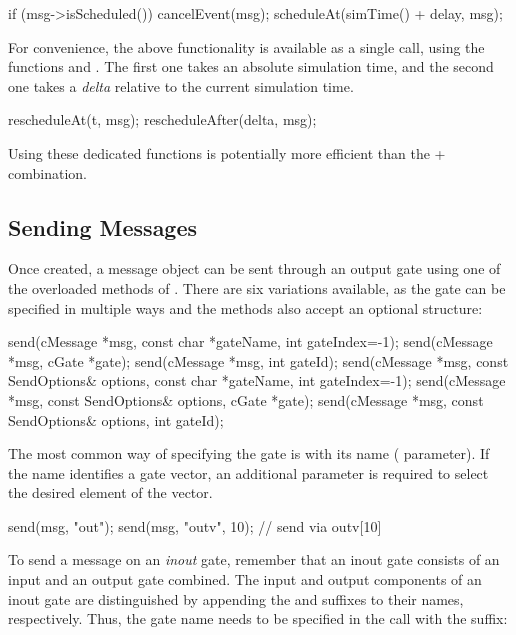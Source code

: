 \begin{cpp}
if (msg->isScheduled())
    cancelEvent(msg);
scheduleAt(simTime() + delay, msg);
\end{cpp}

For convenience, the above functionality is available as a single
call, using the functions  and .
The first one takes an absolute simulation time, and the second one
takes a \textit{delta} relative to the current simulation time.

\begin{cpp}
rescheduleAt(t, msg);
rescheduleAfter(delta, msg);
\end{cpp}

Using these dedicated functions is potentially more efficient than the
 +  combination.

\subsection{Sending Messages}
\label{sec:simple-modules:sending-messages}

Once created, a message object can be sent through an output
gate using one of the overloaded  methods of .
There are six variations available, as the gate can be specified in
multiple ways and the methods also accept an optional  structure:

\begin{cpp}
send(cMessage *msg, const char *gateName, int gateIndex=-1);
send(cMessage *msg, cGate *gate);
send(cMessage *msg, int gateId);
send(cMessage *msg, const SendOptions& options, const char *gateName, int gateIndex=-1);
send(cMessage *msg, const SendOptions& options, cGate *gate);
send(cMessage *msg, const SendOptions& options, int gateId);
\end{cpp}

The most common way of specifying the gate is with its name (
parameter). If the name identifies a gate vector, an additional 
parameter is required to select the desired element of the vector.

\begin{cpp}
send(msg, "out");
send(msg, "outv", 10); // send via outv[10]
\end{cpp}

To send a message on an \textit{inout} gate, remember that an inout gate
consists of an input and an output gate combined. The input and output
components of an inout gate are distinguished by appending the  and
 suffixes to their names, respectively. Thus, the gate name needs to be
specified in the  call with the  suffix:

